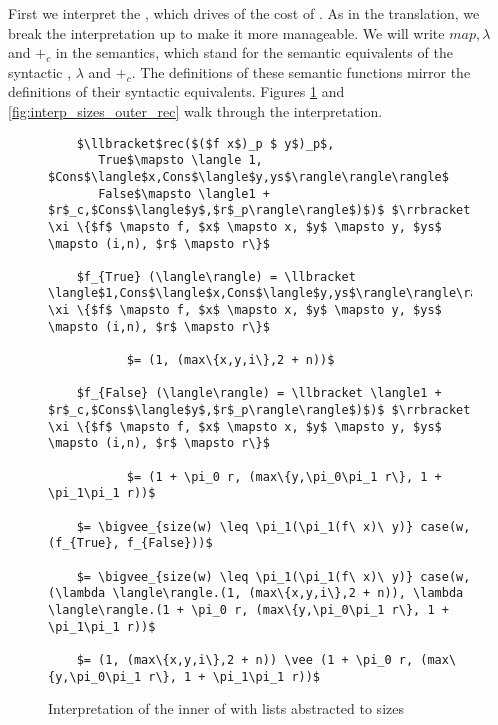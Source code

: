 First we interpret the , which drives of the cost of .  As in
the translation, we break the interpretation up to make it more manageable.  We
will write $map, \lambda$ and $+_c$ in the semantics, which stand for the
semantic equivalents of the syntactic , $\lambda$ and $+_c$.  The
definitions of these semantic functions mirror the definitions of their
syntactic equivalents.  Figures \ref{fig:interp_sizes_inner_rec} and
\ref{fig:interp_sizes_outer_rec} walk through the interpretation.
%
\begin{figure}[H]
  \caption{Interpretation of the inner  of  with lists abstracted to sizes}
  \label{fig:interp_sizes_inner_rec}
  \begin{lstlisting}
    $\llbracket$rec($($f x$)_p $ y$)_p$,
       True$\mapsto \langle 1, $Cons$\langle$x,Cons$\langle$y,ys$\rangle\rangle\rangle$
       False$\mapsto \langle1 + $r$_c,$Cons$\langle$y$,$r$_p\rangle\rangle$)$)$ $\rrbracket \xi \{$f$ \mapsto f, $x$ \mapsto x, $y$ \mapsto y, $ys$ \mapsto (i,n), $r$ \mapsto r\}$

    $f_{True} (\langle\rangle) = \llbracket \langle$1,Cons$\langle$x,Cons$\langle$y,ys$\rangle\rangle\rangle\rrbracket \xi \{$f$ \mapsto f, $x$ \mapsto x, $y$ \mapsto y, $ys$ \mapsto (i,n), $r$ \mapsto r\}$

           $= (1, (max\{x,y,i\},2 + n))$

    $f_{False} (\langle\rangle) = \llbracket \langle1 + $r$_c,$Cons$\langle$y$,$r$_p\rangle\rangle$)$)$ $\rrbracket \xi \{$f$ \mapsto f, $x$ \mapsto x, $y$ \mapsto y, $ys$ \mapsto (i,n), $r$ \mapsto r\}$

           $= (1 + \pi_0 r, (max\{y,\pi_0\pi_1 r\}, 1 + \pi_1\pi_1 r))$

    $= \bigvee_{size(w) \leq \pi_1(\pi_1(f\ x)\ y)} case(w, (f_{True}, f_{False}))$

    $= \bigvee_{size(w) \leq \pi_1(\pi_1(f\ x)\ y)} case(w, (\lambda \langle\rangle.(1, (max\{x,y,i\},2 + n)), \lambda \langle\rangle.(1 + \pi_0 r, (max\{y,\pi_0\pi_1 r\}, 1 + \pi_1\pi_1 r))$

    $= (1, (max\{x,y,i\},2 + n)) \vee (1 + \pi_0 r, (max\{y,\pi_0\pi_1 r\}, 1 + \pi_1\pi_1 r))$
  \end{lstlisting}
\end{figure}
%
